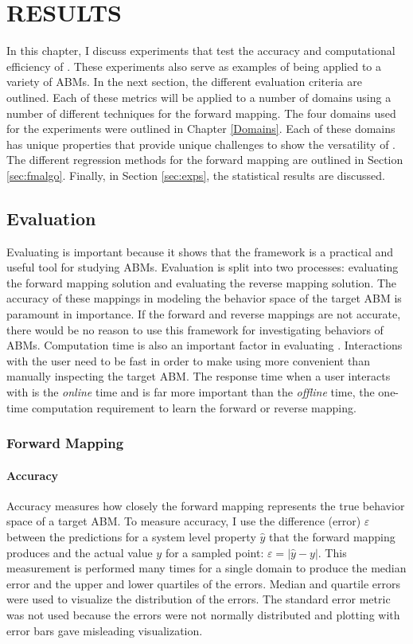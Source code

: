 \chapter{RESULTS}
\thispagestyle{plain}

\label{Results}

In this chapter, I discuss experiments that test the  accuracy and computational efficiency of \fw.
These experiments also serve as examples of \fw being applied to a variety of ABMs.
In the next section, the different evaluation criteria are outlined.
Each of these metrics will be applied to a number of domains using a number of different techniques for the forward mapping.
The four domains used for the experiments were outlined in Chapter \ref{Domains}.
Each of these domains has unique properties that provide unique challenges to show the versatility of \fw.
The different regression methods for the forward mapping are outlined in Section \ref{sec:fmalgo}.
Finally, in Section \ref{sec:exps}, the statistical results are discussed.

\section{Evaluation}

Evaluating \fw is important because it shows that the framework is a practical and useful tool for studying ABMs.
Evaluation is split into two processes: evaluating the forward mapping solution and evaluating the reverse mapping solution.
The accuracy of these mappings in modeling the behavior space of the target ABM is paramount in importance.
If the forward and reverse mappings are not accurate, there would be no reason to use this framework for investigating behaviors of ABMs.
Computation time is also an important factor in evaluating \fw.
Interactions with the user need to be fast in order to make using \fw more convenient than manually inspecting the target ABM.
The response time when a user interacts with \fw is the \textit{online} time and is far more important than the \textit{offline} time, the one-time computation requirement to learn the forward or reverse mapping.


 \subsection{Forward Mapping}

  \subsubsection{Accuracy}
Accuracy measures how closely the forward mapping represents the true behavior space of a target ABM.
To measure accuracy, I use the difference (error) $\varepsilon$ between the predictions for a system level property $\hat y$ that the forward mapping produces and the actual value $y$ for a sampled point: $\varepsilon = |\hat y - y|$.
This measurement is performed many times for a single domain to produce the median error and the upper and lower quartiles of the errors.
Median and quartile errors were used to visualize the distribution of the errors.
The standard error metric was not used because the errors were not normally distributed and plotting with error bars gave misleading visualization.

